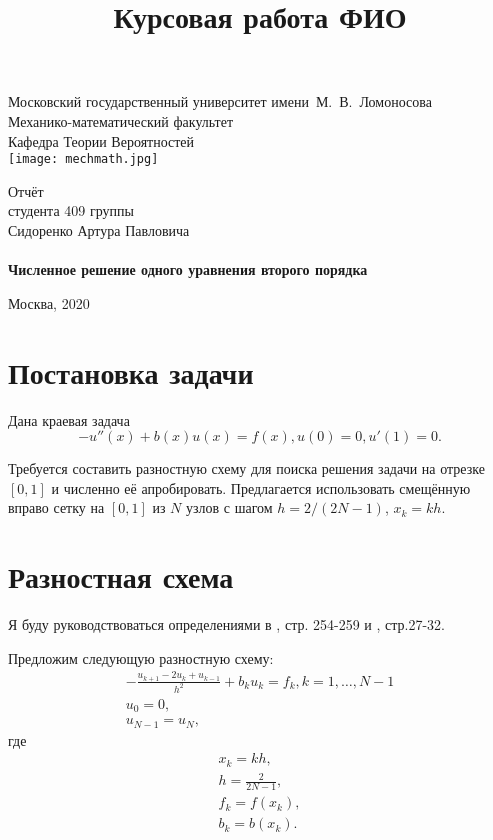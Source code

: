 \documentclass[12 pt, russian]{article}
\title{Курсовая работа ФИО}
\newcommand\beq{\begin{equation}}
\newcommand\eeq{\end{equation}}
\newcommand\bea{\begin{eqnarray}}
\newcommand\eea{\end{eqnarray}}
\begin{document}
\thispagestyle{empty}
\newtheorem{Thm}{Теорема}[section]
\newtheorem{Lem}{Лемма}[section]
\newtheorem{Rem}{Замечание}[section]
\newtheorem{Co}{Следствие}[section]
\theoremstyle{definition}
\newtheorem{Exam}{Пример}[section]
\newtheorem{Dfn}{Определение}[section]
\sloppy
\begin{titlepage}
\begin{center}
Московский государственный университет имени~М.~В.~Ломоносова\\
Механико-математический факультет\\
Кафедра Теории Вероятностей\\
\centering
\texttt{[image: mechmath.jpg]}

\vspace*{100pt} Отчёт\\
студента 409 группы \\
Сидоренко Артура Павловича \\
\vspace{10pt} {\Large{\textbf{}}\\}
\textbf{Численное решение одного уравнения второго порядка}
\vspace*{40pt}


\vspace*{\fill} Москва, 2020
\end{center}
\end{titlepage}

\section{Постановка задачи}
Дана краевая задача
\beq
\label{task}
-u''(x) + b(x) u(x) = f(x), u(0) = 0, u'(1) = 0.
\eeq

Требуется составить разностную схему для поиска решения задачи на отрезке $[0, 1]$ и численно её апробировать. Предлагается использовать смещённую вправо сетку на $[0, 1]$ из $N$ узлов с шагом $h = 2 / (2N - 1)$,  $x_k = kh$. 


\section{Разностная схема}

Я буду руководствоваться определениями в \cite{Kornev1}, стр. 254-259 и \cite{Kornev2}, стр.27-32.

Предложим следующую разностную схему:
\bea
\label{sceme}
-\frac{u_{k+1} - 2u_k + u_{k-1}}{h^2} + b_k u_k = f_k,  k = 1, \dots, N - 1\\
u_0 = 0, \\
u_{N-1} = u_N,  \label{sceme_last}
\eea
где
\bea
x_k = kh, \\
h = \frac{2}{2N - 1}, \\
f_k = f(x_k), \\
b_k = b(x_k).
\eea
\end{document}

